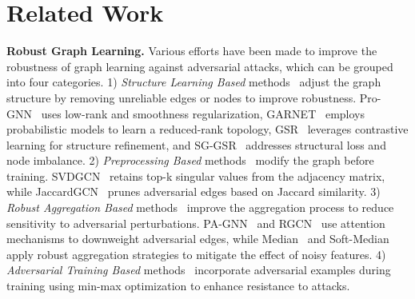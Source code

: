 \section{Related Work}

\textbf{Robust Graph Learning.}
Various efforts have been made to improve the robustness of graph learning against adversarial attacks, which can be grouped into four categories. 
1) \textit{Structure Learning Based} methods~\cite{jin2020graph, deng2022garnet, zhao2023self, in2024self} adjust the graph structure by removing unreliable edges or nodes to improve robustness. Pro-GNN~\cite{jin2020graph} uses low-rank and smoothness regularization, GARNET~\cite{deng2022garnet} employs probabilistic models to learn a reduced-rank topology, GSR~\cite{zhao2023self} leverages contrastive learning for structure refinement, and SG-GSR~\cite{in2024self} addresses structural loss and node imbalance.
2) \textit{Preprocessing Based} methods~\cite{entezari2020all, wu2019adversarial}  modify the graph before training. SVDGCN~\cite{entezari2020all} retains top-k singular values from the adjacency matrix, while JaccardGCN~\cite{wu2019adversarial} prunes adversarial edges based on Jaccard similarity.
3) \textit{Robust Aggregation Based} methods~\cite{tang2020transferring, zhu2019robust, chen2021understanding, geisler2021robustness} improve the aggregation process to reduce sensitivity to adversarial perturbations. PA-GNN~\cite{tang2020transferring} and RGCN~\cite{zhu2019robust} use attention mechanisms to downweight adversarial edges, while Median~\cite{chen2021understanding} and Soft-Median~\cite{geisler2021robustness} apply robust aggregation strategies to mitigate the effect of noisy features.
4) \textit{Adversarial Training Based} methods~\cite{xu2019topology} 
incorporate adversarial examples during training using min-max optimization to enhance resistance to attacks.

